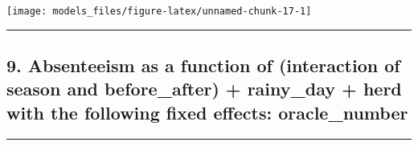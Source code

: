 \documentclass[]{article}
\begin{document}
\begin{center}\texttt{[image: models\_files/figure-latex/unnamed-chunk-17-1]} \end{center}

\newpage

\begin{center}\rule{0.5\linewidth}{\linethickness}\end{center}

\subsection{9. Absenteeism as a function of (interaction of season and
before\_after) + rainy\_day + herd with the following fixed effects:
oracle\_number}\label{absenteeism-as-a-function-of-interaction-of-season-and-before_after-rainy_day-herd-with-the-following-fixed-effects-oracle_number}

\begin{center}\rule{0.5\linewidth}{\linethickness}\end{center}
\end{document}
